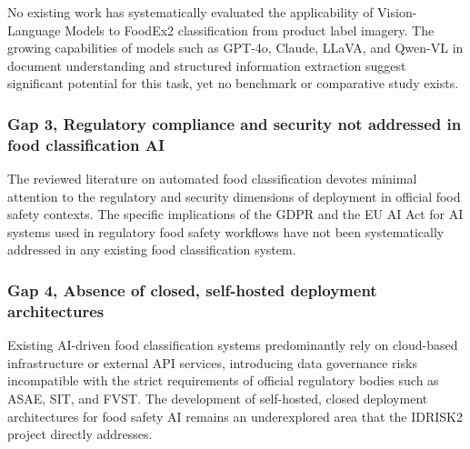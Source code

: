 No existing work has systematically evaluated the applicability of Vision-Language Models to FoodEx2 classification from product label imagery. The growing capabilities of models such as GPT-4o, Claude, LLaVA, and Qwen-VL in document understanding and structured information extraction suggest significant potential for this task, yet no benchmark or comparative study exists.

\hypertarget{gap-3-regulatory-compliance-and-security-not-addressed-in-food-classification-ai}{%
\subsubsection{Gap 3, Regulatory compliance and security not addressed in food classification AI}\label{gap-3-regulatory-compliance-and-security-not-addressed-in-food-classification-ai}}

The reviewed literature on automated food classification devotes minimal attention to the regulatory and security dimensions of deployment in official food safety contexts. The specific implications of the GDPR and the EU AI Act for AI systems used in regulatory food safety workflows have not been systematically addressed in any existing food classification system.

\hypertarget{gap-4-absence-of-closed-self-hosted-deployment-architectures}{%
\subsubsection{Gap 4, Absence of closed, self-hosted deployment architectures}\label{gap-4-absence-of-closed-self-hosted-deployment-architectures}}

Existing AI-driven food classification systems predominantly rely on cloud-based infrastructure or external API services, introducing data governance risks incompatible with the strict requirements of official regulatory bodies such as ASAE, SIT, and FVST. The development of self-hosted, closed deployment architectures for food safety AI remains an underexplored area that the IDRISK2 project directly addresses.
